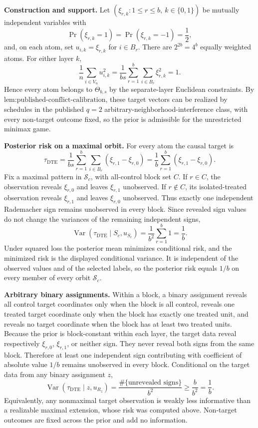 \textbf{Construction and support.} Let \((\xi_{r,k}:1\leq r\leq b,\ k\in\{0,1\})\) be mutually independent variables with
\[
\Pr(\xi_{r,k}=1)=\Pr(\xi_{r,k}=-1)=\frac12,
\]
and, on each atom, set \(u_{i,k}=\xi_{r,k}\) for \(i\in B_r\). There are \(2^{2b}=4^b\) equally weighted atoms. For either layer \(k\),
\[
\frac1n\sum_{i\in V_n}u_{i,k}^2
=\frac1{bs}\sum_{r=1}^b\sum_{i\in B_r}\xi_{r,k}^2
=1.
\]
Hence every atom belongs to \(\Theta_{b,s}\) by the separate-layer Euclidean constraints. By \(\text{lem:published-conflict-calibration}\), these target vectors can be realized by schedules in the published \(q=2\) arbitrary-neighborhood-interference class, with every non-target outcome fixed, so the prior is admissible for the unrestricted minimax game.

\textbf{Posterior risk on a maximal orbit.} For every atom the causal target is
\[
\tau_{\mathrm{DTE}}
=\frac1{bs}\sum_{r=1}^b\sum_{i\in B_r}(\xi_{r,1}-\xi_{r,0})
=\frac1b\sum_{r=1}^b(\xi_{r,1}-\xi_{r,0}).
\]
Fix a maximal pattern in \(\mathcal S_c\), with all-control block set \(C\). If \(r\in C\), the observation reveals \(\xi_{r,0}\) and leaves \(\xi_{r,1}\) unobserved. If \(r\notin C\), its isolated-treated observation reveals \(\xi_{r,1}\) and leaves \(\xi_{r,0}\) unobserved. Thus exactly one independent Rademacher sign remains unobserved in every block. Since revealed sign values do not change the variances of the remaining independent signs,
\[
\operatorname{Var}\!\left(\tau_{\mathrm{DTE}}\mid S_c,u_{S_c}\right)
=\frac1{b^2}\sum_{r=1}^b1
=\frac1b.
\]
Under squared loss the posterior mean minimizes conditional risk, and the minimized risk is the displayed conditional variance. It is independent of the observed values and of the selected labels, so the posterior risk equals \(1/b\) on every member of every orbit \(\mathcal S_c\).

\textbf{Arbitrary binary assignments.} Within a block, a binary assignment reveals all control target coordinates only when the block is all control, reveals one treated target coordinate only when the block has exactly one treated unit, and reveals no target coordinate when the block has at least two treated units. Because the prior is block-constant within each layer, the target data reveal respectively \(\xi_{r,0}\), \(\xi_{r,1}\), or neither sign. They never reveal both signs from the same block. Therefore at least one independent sign contributing with coefficient of absolute value \(1/b\) remains unobserved in every block. Conditional on the target data from any binary assignment \(z\),
\[
\operatorname{Var}\!\left(\tau_{\mathrm{DTE}}\mid z,u_{R_z}\right)
=\frac{\#\{\text{unrevealed signs}\}}{b^2}
\geq\frac b{b^2}
=\frac1b.
\]
Equivalently, any nonmaximal target observation is weakly less informative than a realizable maximal extension, whose risk was computed above. Non-target outcomes are fixed across the prior and add no information.

